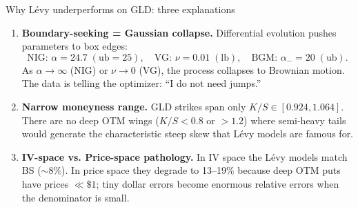 \documentclass[aspectratio=169]{beamer}
\begin{document}
\begin{frame}{Why Lévy underperforms on GLD: three explanations}
  \begin{enumerate}
    \item \textbf{Boundary-seeking = Gaussian collapse.}
    Differential evolution pushes parameters to box edges:
    \[
      \text{NIG: }\alpha=24.7\;(\text{ub}=25),\quad
      \text{VG: }\nu=0.01\;(\text{lb}),\quad
      \text{BGM: }\alpha_-=20\;(\text{ub}).
    \]
    As $\alpha\to\infty$ (NIG) or $\nu\to 0$ (VG), the process collapses to
    Brownian motion.  The data is telling the optimizer: ``I do not need jumps.''

    \vspace{0.3cm}
    \item \textbf{Narrow moneyness range.}
    GLD strikes span only $K/S \in [0.924, 1.064]$.  There are no deep OTM
    wings ($K/S < 0.8$ or $> 1.2$) where semi-heavy tails would generate the
    characteristic steep skew that Lévy models are famous for.

    \vspace{0.3cm}
    \item \textbf{IV-space vs. Price-space pathology.}
    In IV space the Lévy models match BS ($\sim$8\%).  In price space they
    degrade to 13--19\% because deep OTM puts have prices $\ll \$1$; tiny
    dollar errors become enormous relative errors when the denominator is small.
  \end{enumerate}
\end{frame}

\end{document}
